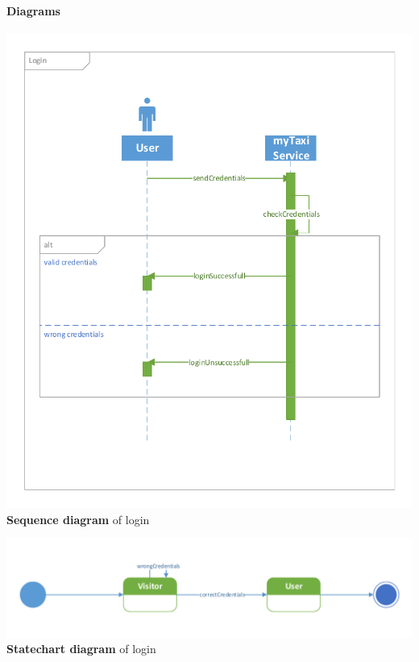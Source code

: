 	\paragraph{Diagrams}
		\begin{center}
			\includegraphics[width=\textwidth]{diagrams/login}
			\textbf{Sequence diagram} of login
		\end{center}
		\begin{center}
			\includegraphics[width=\textwidth]{diagrams/login_state}
			\textbf{Statechart diagram} of login
		\end{center}

